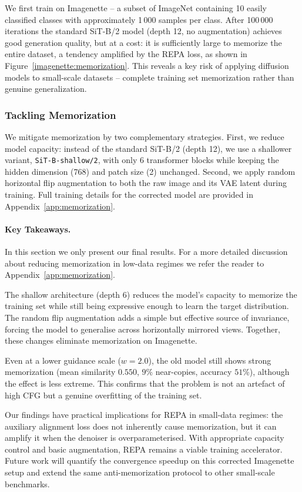 We first train on Imagenette -- a subset of ImageNet containing 10 easily classified
classes with approximately 1\,000 samples per class. After 100\,000 iterations the
standard SiT-B/2 model (depth 12, no augmentation) achieves good generation quality,
but at a cost: it is sufficiently large to memorize the entire dataset, a tendency
amplified by the REPA loss, as shown in Figure~\ref{imagenette:memorization}. This
reveals a key risk of applying diffusion models to small-scale datasets -- complete
training set memorization rather than genuine generalization.

\subsubsection{Tackling Memorization}

We mitigate memorization by two complementary strategies. First, we reduce model
capacity: instead of the standard SiT-B/2 (depth 12), we use a shallower variant,
\texttt{SiT-B-shallow/2}, with only 6 transformer blocks while keeping the hidden
dimension (768) and patch size (2) unchanged. Second, we apply random horizontal
flip augmentation to both the raw image and its VAE latent during training. Full
training details for the corrected model are provided in Appendix~\ref{app:memorization}.

\paragraph{Key Takeaways.} In this section we only present our final results. For
a more detailed discussion about reducing memorization in low-data regimes
we refer the reader to Appendix~\ref{app:memorization}.

The shallow architecture (depth 6) reduces the model's capacity to memorize
the training set while still being expressive enough to learn the target
distribution. The random flip augmentation adds a simple but effective source
of invariance, forcing the model to generalise across horizontally mirrored
views. Together, these changes eliminate memorization on Imagenette.

Even at a lower guidance scale ($w=2.0$), the old model still
shows strong memorization (mean similarity $0.550$, $9\%$ near-copies, accuracy
$51\%$), although the effect is less extreme. This confirms that the problem
is not an artefact of high CFG but a genuine overfitting of the training set.

Our findings have practical implications for REPA in small-data regimes: the
auxiliary alignment loss does not inherently cause memorization, but it can
amplify it when the denoiser is overparameterised. With appropriate capacity
control and basic augmentation, REPA remains a viable training accelerator.
Future work will quantify the convergence speedup on this corrected Imagenette
setup and extend the same anti-memorization protocol to other small-scale
benchmarks.

